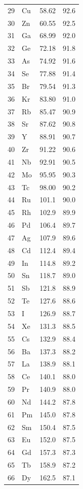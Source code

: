 \documentclass[12pt,a4paper]{article}
\begin{document}
\begin{longtable}{c l c c}
		29 & Cu  & 58.62  & 92.6 \\
		30 & Zn  & 60.55  & 92.5 \\
		31 & Ga  & 68.99  & 92.0 \\
		32 & Ge  & 72.18  & 91.8 \\
		33 & As  & 74.92  & 91.6 \\
		34 & Se  & 77.88  & 91.4 \\
		35 & Br  & 79.54  & 91.3 \\
		36 & Kr  & 83.80  & 91.0 \\
		37 & Rb  & 85.47  & 90.9 \\
		38 & Sr  & 87.62  & 90.8 \\
		39 & Y   & 88.91  & 90.7 \\
		40 & Zr  & 91.22  & 90.6 \\
		41 & Nb  & 92.91  & 90.5 \\
		42 & Mo  & 95.95  & 90.3 \\
		43 & Tc  & 98.00  & 90.2 \\
		44 & Ru  & 101.1  & 90.0 \\
		45 & Rh  & 102.9  & 89.9 \\
		46 & Pd  & 106.4  & 89.7 \\
		47 & Ag  & 107.9  & 89.6 \\
		48 & Cd  & 112.4  & 89.4 \\
		49 & In  & 114.8  & 89.2 \\
		50 & Sn  & 118.7  & 89.0 \\
		51 & Sb  & 121.8  & 88.9 \\
		52 & Te  & 127.6  & 88.6 \\
		53 & I   & 126.9  & 88.7 \\
		54 & Xe  & 131.3  & 88.5 \\
		55 & Cs  & 132.9  & 88.4 \\
		56 & Ba  & 137.3  & 88.2 \\
		57 & La  & 138.9  & 88.1 \\
		58 & Ce  & 140.1  & 88.0 \\
		59 & Pr  & 140.9  & 88.0 \\
		60 & Nd  & 144.2  & 87.8 \\
		61 & Pm  & 145.0  & 87.8 \\
		62 & Sm  & 150.4  & 87.5 \\
		63 & Eu  & 152.0  & 87.5 \\
		64 & Gd  & 157.3  & 87.3 \\
		65 & Tb  & 158.9  & 87.2 \\
		66 & Dy  & 162.5  & 87.1 \\

\end{longtable}
\end{document}
